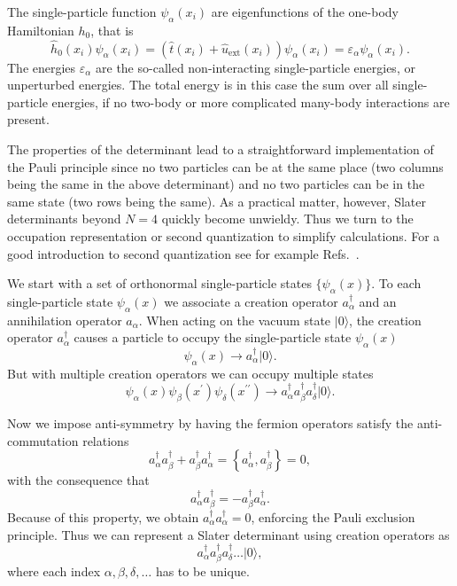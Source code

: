The single-particle function $\psi_{\alpha}(x_i)$ are eigenfunctions
of the one-body Hamiltonian $h_0$, that is
\[
\hat{h}_0(x_i) \psi_{\alpha}(x_i)=\left(\hat{t}(x_i) +
\hat{u}_{\mathrm{ext}}(x_i)\right)\psi_{\alpha}(x_i)=\varepsilon_{\alpha}\psi_{\alpha}(x_i).
\]
The energies $\varepsilon_{\alpha}$ are the so-called non-interacting
single-particle energies, or unperturbed energies.  The total energy
is in this case the sum over all single-particle energies, if no
two-body or more complicated many-body interactions are present.

The properties of the determinant lead to a straightforward
implementation of the Pauli principle since no two particles can be at
the same place (two columns being the same in the above determinant)
and no two particles can be in the same state (two rows being the
same).  As a practical matter, however, Slater determinants beyond
$N=4$ quickly become unwieldy. Thus we turn to the occupation
  representation or second quantization to simplify
calculations. For a good introduction to second quantization see for
example Refs.~\cite{blaizot,Ch11_Dickhoff2008,Ch11_Mattuck1992,shavittbartlett2009}.

We start with a set of orthonormal single-particle states $\{
\psi_{\alpha}(x) \}$.  To each single-particle state
$\psi_{\alpha}(x)$ we associate a creation operator
$a^\dagger_{\alpha}$ and an annihilation operator $a_{\alpha}$.  When
acting on the vacuum state $| 0 \rangle$, the creation operator
$a^\dagger_{\alpha}$ causes a particle to occupy the single-particle
state $\psi_{\alpha}(x)$
\[
\psi_{\alpha}(x) \rightarrow a^\dagger_{\alpha} |0 \rangle.
\]
But with multiple creation operators we can occupy multiple states
\[
\psi_{\alpha}(x) \psi_{\beta}(x^\prime) \psi_{\delta}(x^{\prime
  \prime}) \rightarrow a^\dagger_{\alpha} a^\dagger_{\beta}
a^\dagger_{\delta} |0 \rangle.
\]

Now we impose anti-symmetry by having the fermion operators satisfy
the anti-commutation relations
\[
a^\dagger_{\alpha} a^\dagger_{\beta} + a^\dagger_{\beta}
a^\dagger_{\alpha} = \left\{ a^\dagger_{\alpha}
,a^\dagger_{\beta}\right\}= 0,
\]
with the consequence that
\[
a^\dagger_{\alpha} a^\dagger_{\beta} = - a^\dagger_{\beta}
a^\dagger_{\alpha}.
\]
Because of this property, we obtain $a^\dagger_{\alpha}
a^\dagger_{\alpha} = 0$, enforcing the Pauli exclusion principle.
Thus we can represent a Slater determinant using creation operators as
\[
a^\dagger_{\alpha} a^\dagger_{\beta} a^\dagger_{\delta} \ldots |0\rangle,
\]
where each index $\alpha,\beta,\delta, \ldots$ has to be unique.

